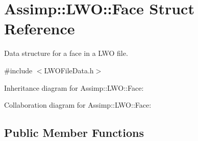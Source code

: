 \hypertarget{struct_assimp_1_1_l_w_o_1_1_face}{\section{Assimp\+:\+:L\+W\+O\+:\+:Face Struct Reference}
\label{struct_assimp_1_1_l_w_o_1_1_face}
}


Data structure for a face in a L\+W\+O file.  




{\ttfamily \#include $<$L\+W\+O\+File\+Data.\+h$>$}



Inheritance diagram for Assimp\+:\+:L\+W\+O\+:\+:Face\+:


Collaboration diagram for Assimp\+:\+:L\+W\+O\+:\+:Face\+:
\subsection*{Public Member Functions}
